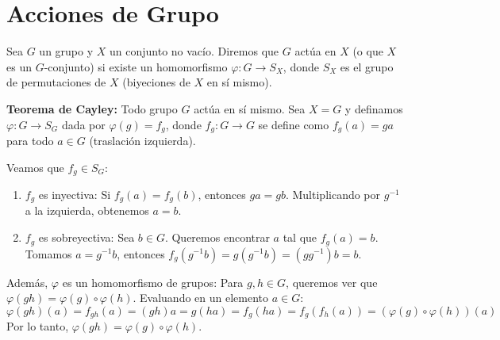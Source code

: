 \section{Acciones de Grupo}

\begin{defi}
    Sea $G$ un grupo y $X$ un conjunto no vacío. Diremos que $G$ actúa en $X$ (o que $X$ es un $G$-conjunto) si existe un homomorfismo $\varphi: G \to S_X$, donde $S_X$ es el grupo de permutaciones de $X$ (biyeciones de $X$ en sí mismo).
\end{defi}

\begin{eje}
    \textbf{Teorema de Cayley:} Todo grupo $G$ actúa en sí mismo.
    Sea $X=G$ y definamos $\varphi: G \to S_G$ dada por $\varphi(g) = f_g$, donde $f_g: G \to G$ se define como $f_g(a) = ga$ para todo $a \in G$ (traslación izquierda).
    
    Veamos que $f_g \in S_G$:
    \begin{enumerate}
        \item $f_g$ es inyectiva: Si $f_g(a) = f_g(b)$, entonces $ga = gb$. Multiplicando por $g^{-1}$ a la izquierda, obtenemos $a = b$.
        \item $f_g$ es sobreyectiva: Sea $b \in G$. Queremos encontrar $a$ tal que $f_g(a) = b$. Tomamos $a = g^{-1}b$, entonces $f_g(g^{-1}b) = g(g^{-1}b) = (gg^{-1})b = b$.
    \end{enumerate}
    Además, $\varphi$ es un homomorfismo de grupos:
    Para $g, h \in G$, queremos ver que $\varphi(gh) = \varphi(g) \circ \varphi(h)$.
    Evaluando en un elemento $a \in G$:
    \begin{equation*}
        \varphi(gh)(a) = f_{gh}(a) = (gh)a = g(ha) = f_g(ha) = f_g(f_h(a)) = (\varphi(g) \circ \varphi(h))(a)
    \end{equation*}
    Por lo tanto, $\varphi(gh) = \varphi(g) \circ \varphi(h)$.
\end{eje}



